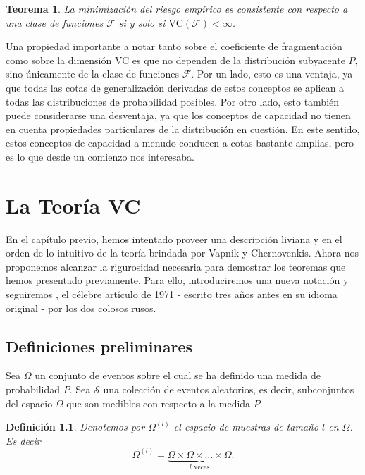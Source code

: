 \documentclass{report}
\newtheorem{thm}{Teorema}[section]
\newtheorem{dfn}{Definición}[section]
\begin{document}
\begin{thm}
    La minimización del riesgo empírico es consistente con respecto a una clase de funciones \(\mathcal{F}\) si y solo si
    \(\text{VC}(\mathcal{F}) < \infty\).
\end{thm}

Una propiedad importante a notar tanto sobre el coeficiente de fragmentación como sobre la
dimensión VC es que no dependen de la distribución subyacente \( P \), sino únicamente de la
clase de funciones \(\mathcal{F}\). Por un lado, esto es una ventaja, ya que todas las cotas de
generalización derivadas de estos conceptos se aplican a todas las distribuciones de probabilidad
posibles. Por otro lado, esto también puede considerarse una desventaja, ya que los conceptos de
capacidad no tienen en cuenta propiedades particulares de la distribución en cuestión. En este
sentido, estos conceptos de capacidad a menudo conducen a cotas bastante amplias, pero es lo que desde
un comienzo nos interesaba.


\chapter{La Teoría VC}

En el capítulo previo, hemos intentado proveer una descripción liviana y en el orden de lo intuitivo de la teoría brindada por
Vapnik y Chernovenkis. Ahora nos proponemos alcanzar la rigurosidad necesaria para demostrar los teoremas que hemos presentado
previamente. Para ello, introduciremos una nueva notación y seguiremos \cite{vapnik1971}, el célebre artículo de 1971 - escrito tres años antes en su
idioma original - por los dos colosos rusos.

\section{Definiciones preliminares}

Sea \( \Omega \) un conjunto de eventos sobre el cual se ha definido una medida de probabilidad \( P \). Sea \( \mathcal{S} \) una colección de eventos
aleatorios, es decir, subconjuntos del espacio \( \Omega \) que son medibles con respecto
a la medida \( P \).
\begin{dfn}
    Denotemos por \( \Omega^{(l)} \) el espacio de muestras de tamaño \( l \) en \( \Omega \). Es decir
    \[ \Omega^{(l)} = \underbrace{\Omega \times \Omega \times \ldots \times \Omega}_{l \text{ veces}}. \]
\end{dfn}
\end{document}
